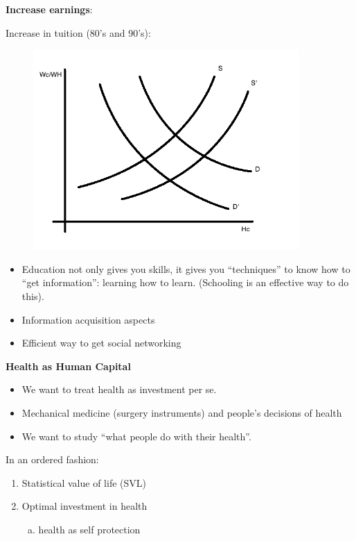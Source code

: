 \documentclass[14pt,notitlepage]{article}
\begin{document}
\textbf{Increase earnings}:

Increase in tuition (80's and 90's):

\begin{center}
\begin{figure}[H] 
\caption{}
\centering
\includegraphics[width=4in, height=3in]{plot12.png}
\end{figure}
\end{center}

\begin{itemize}
\item Education not only gives you skills, it gives you ``techniques'' to know how to ``get information'': learning how to learn. (Schooling is an effective way to do this).

\item Information acquisition aspects

\item Efficient way to get social networking
\end{itemize}

\textbf{Health as Human Capital}

\begin{itemize}
\item We want to treat health as investment per se.
\item Mechanical medicine (surgery instruments) and people's decisions of health
\item We want to study ``what people do with their health''.
\end{itemize}
In an ordered fashion:
\begin{enumerate}[1.]
\item Statistical value of life (SVL)
\item Optimal investment in health
    \begin{enumerate}[a.]
    \item health as self protection
    \end{enumerate}
\end{enumerate}
\end{document}
